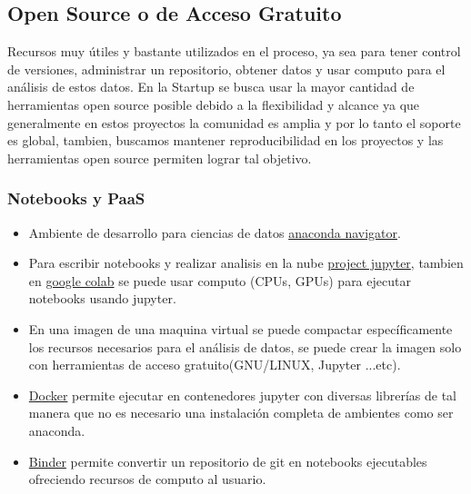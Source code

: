 \documentclass[12pt,a4paper,openright]{article}
\begin{document}
\subsection{Open Source o de Acceso Gratuito}
Recursos muy útiles y bastante utilizados en el proceso, ya sea para tener control de versiones, administrar un repositorio, obtener datos y usar computo para el análisis de estos datos. En la Startup se busca usar la mayor cantidad de herramientas open source posible debido a la flexibilidad y alcance ya que generalmente en estos proyectos la comunidad es amplia y por lo tanto el soporte es global, tambien, buscamos mantener reproducibilidad en los proyectos y las herramientas open source permiten lograr tal objetivo.

\subsubsection{Notebooks y PaaS}

\begin{itemize}
    \item Ambiente de desarrollo para ciencias de datos \href{https://www.anaconda.com/}{anaconda navigator}.
    \item Para escribir notebooks y realizar analisis en la nube \href{https://jupyter.org/}{project jupyter}, tambien en \href{https://colab.research.google.com/notebooks/intro.ipynb?utm_source=scs-index}{google colab} se puede usar computo (CPUs, GPUs) para ejecutar notebooks usando jupyter.
    \item En una imagen de una maquina virtual se puede compactar específicamente los recursos necesarios para el análisis de datos, se puede crear la imagen solo con herramientas de acceso gratuito(GNU/LINUX, Jupyter ...etc).
    \item \href{https://hub.docker.com/}{Docker} permite ejecutar en contenedores jupyter con diversas librerías de tal manera que no es necesario una instalación completa de ambientes como ser anaconda.
    \item \href{https://mybinder.org/}{Binder} permite convertir un repositorio de git en notebooks ejecutables ofreciendo recursos de computo al usuario.
    
\end{itemize}
\end{document}
